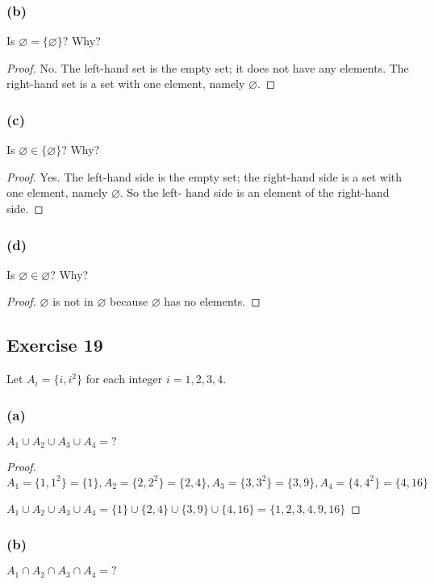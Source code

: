 \documentclass[14pt]{extarticle}
\newcommand{\es}{\varnothing}
\begin{document}
\subsubsection{(b)}
Is $\es = \{\es\}$? Why?

\begin{proof}
  No. The left-hand set is the empty set; it does not have any elements. The right-hand set is a set with one element, namely $\es$.
\end{proof}

\subsubsection{(c)}
Is $\es \in \{\es\}$? Why?

\begin{proof}
  Yes. The left-hand side is the empty set; the right-hand side is a set with one element, namely $\es$. So the left-
  hand side is an element of the right-hand side.
\end{proof}

\subsubsection{(d)}
Is $\es \in \es$? Why?

\begin{proof}
  $\es$ is not in $\es$ because $\es$ has no elements.
\end{proof}

\subsection{Exercise 19}
Let \(A_i = \{i, i^2\}\) for each integer \(i = 1, 2, 3, 4\).

\subsubsection{(a)}
\(A_1 \cup A_2 \cup A_3 \cup A_4 = ?\)

\begin{proof}
  \(A_1 = \{1, 1^2\} = \{1\}, A_2 = \{2, 2^2\} = \{2, 4\}, A_3 = \{3, 3^2\} = \{3, 9\}, A_4 = \{4, 4^2\} = \{4, 16\}\)

  \(A_1 \cup A_2 \cup A_3 \cup A_4 = \{1\} \cup \{2, 4\} \cup \{3, 9\} \cup \{4, 16\} = \{1, 2, 3, 4, 9, 16\}\)
\end{proof}

\subsubsection{(b)}
\(A_1 \cap A_2 \cap A_3 \cap A_4 = ?\)
\end{document}
